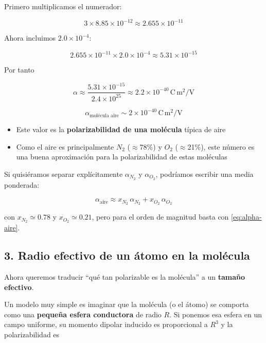 \documentclass{article}
\begin{document}
Primero multiplicamos el numerador:

\[
3\times 8.85\times 10^{-12}
\approx 2.655\times 10^{-11}
\]

Ahora incluimos $2.0\times 10^{-4}$:

\[
2.655\times 10^{-11}\times 2.0\times 10^{-4}
\approx 5.31\times 10^{-15}
\]

Por tanto

\[
\alpha \approx \frac{5.31\times 10^{-15}}{2.4\times 10^{25}}
\approx 2.2\times 10^{-40}\,\text{C}\,\text{m}^{2}/\text{V}
\]

\begin{equation}
\boxed{
\alpha_{\text{molécula aire}} \sim 2\times 10^{-40}\,
\text{C}\,\text{m}^{2}/\text{V}
}
\label{eq:alpha-aire}
\end{equation}

\begin{itemize}
  \item Este valor es la \textbf{polarizabilidad de una molécula} típica de aire
  \item Como el aire es principalmente $N_{2}$ ($\approx$78\%) y $O_{2}$ ($\approx$21\%), este número es una buena aproximación para la polarizabilidad de estas moléculas
\end{itemize}

Si quisiéramos separar explícitamente $\alpha_{N_{2}}$ y $\alpha_{O_{2}}$, podríamos escribir una media ponderada:

\begin{equation}
\alpha_{\text{aire}} \approx
x_{N_{2}}\,\alpha_{N_{2}} + x_{O_{2}}\,\alpha_{O_{2}}
\label{eq:alpha-ponderada}
\end{equation}

con $x_{N_{2}}\simeq 0.78$ y $x_{O_{2}}\simeq 0.21$, pero para el orden de magnitud basta con \eqref{eq:alpha-aire}.

\subsection*{3. Radio efectivo de un átomo en la molécula}

Ahora queremos traducir “qué tan polarizable es la molécula” a un \textbf{tamaño efectivo}.

Un modelo muy simple es imaginar que la molécula (o el átomo) se comporta como una \textbf{pequeña esfera conductora} de radio $R$.  
Si ponemos esa esfera en un campo uniforme, su momento dipolar inducido es proporcional a $R^{3}$ y la polarizabilidad es
\end{document}
